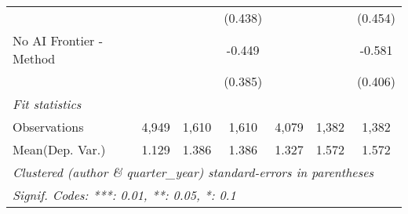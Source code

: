 \begin{tabular}{lcccccc}
                           &               &              & (0.438)      &                &               & (0.454)\\   
   No AI Frontier - Method &               &              & -0.449       &                &               & -0.581\\   
                           &               &              & (0.385)      &                &               & (0.406)\\   
   \midrule
   \emph{Fit statistics}\\
   Observations            & 4,949         & 1,610        & 1,610        & 4,079          & 1,382         & 1,382\\  
Mean(Dep. Var.) & 1.129 & 1.386 & 1.386 & 1.327 & 1.572 & 1.572 \\
   \midrule \midrule
   \multicolumn{7}{l}{\emph{Clustered (author \& quarter\_year) standard-errors in parentheses}}\\
   \multicolumn{7}{l}{\emph{Signif. Codes: ***: 0.01, **: 0.05, *: 0.1}}\\
\end{tabular}
\par\endgroup
